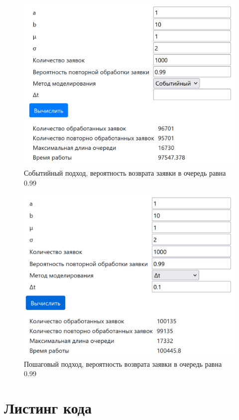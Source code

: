 \documentclass[a4paper, 12pt]{article}
\begin{document}
\begin{figure}[h!]
	\centering \includegraphics[scale=0.7]{5}
	\centering\caption{Событийный подход, вероятность возврата заявки в очередь равна 0.99}
\end{figure}
\begin{figure}[h!]
	\centering \includegraphics[scale=0.7]{6}
	\centering\caption{Пошаговый подход, вероятность возврата заявки в очередь равна 0.99}
\end{figure}
\clearpage
\newpage
\section{Листинг кода}
\end{document}
